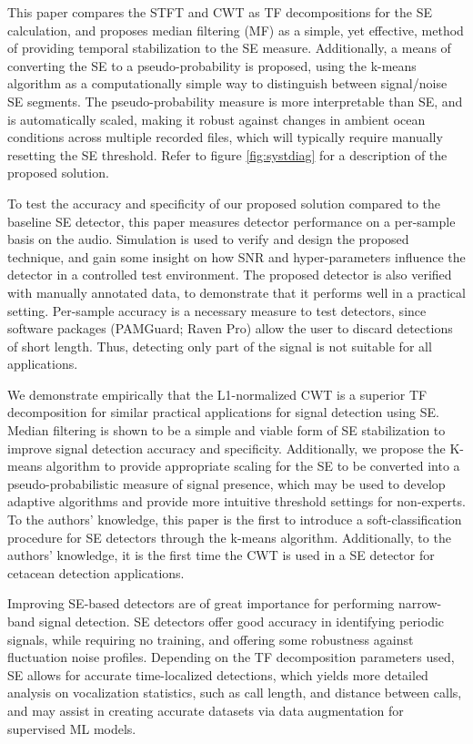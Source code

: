 This paper compares the STFT and CWT as TF decompositions for the SE calculation, and proposes median filtering (MF) as a simple, yet effective, method of providing temporal stabilization to the SE measure. Additionally, a means of converting the SE to a pseudo-probability is proposed, using the k-means algorithm as a computationally simple way to distinguish between signal/noise SE segments. The pseudo-probability measure is more interpretable than SE, and is automatically scaled, making it robust against changes in ambient ocean conditions across multiple recorded files, which will typically require manually resetting the SE threshold.  Refer to figure \ref{fig:systdiag} for a description of the proposed solution.


To test the accuracy and specificity of our proposed solution compared to the baseline SE detector, 
this paper measures detector performance on a per-sample basis on the audio. Simulation is used to verify 
and design the proposed technique, and gain some insight on how SNR and hyper-parameters influence the detector in a 
controlled test environment. The proposed detector is also verified with manually annotated data, to demonstrate that 
it performs well in a practical setting. Per-sample accuracy is a necessary measure to test detectors, since software packages (PAMGuard; Raven Pro) 
allow the user to discard detections of short length. Thus, detecting only part of the signal is not suitable for all applications.

We demonstrate empirically that the L1-normalized CWT is a superior 
TF decomposition for similar practical applications for signal detection using SE. 
Median filtering is shown to be a simple and viable form of SE stabilization to improve 
signal detection accuracy and specificity. Additionally, we propose the K-means algorithm 
to provide appropriate scaling for the SE to be converted into a pseudo-probabilistic measure 
of signal presence, which may be used to develop adaptive algorithms and provide more intuitive 
threshold settings for non-experts. To the authors' knowledge, this paper is the first to introduce a 
soft-classification procedure for SE detectors through the k-means algorithm. Additionally, to the authors' knowledge, 
it is the first time the CWT is used in a SE detector for cetacean detection applications.

Improving SE-based detectors are of great importance for performing narrow-band signal detection. 
SE detectors offer good accuracy in identifying periodic signals, while requiring no training, and offering 
some robustness against fluctuation noise profiles. Depending on the TF decomposition parameters used, 
SE allows for accurate time-localized detections, which yields more detailed analysis on vocalization statistics, 
such as call length, and distance between calls, and may assist in creating accurate datasets via data augmentation for supervised ML models.

